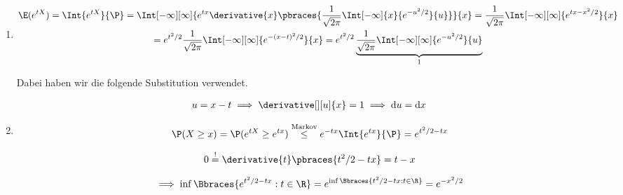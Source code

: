 \begin{solution}

\begin{enumerate}[label = (\alph*)]

    \item

    \begin{multline*}
        \E(e^{t X})
        =
        \Int{e^{t X}}{\P}
        =
        \Int[-\infty][\infty]
        {
            e^{t x}
            \derivative{x}
            \pbraces
            {
                \frac{1}{\sqrt{2 \pi}}
                \Int[-\infty]{x}
                {
                    e^{-u^2 / 2}
                }{u}
            }
        }{x}
        =
        \frac{1}{\sqrt{2 \pi}}
        \Int[-\infty][\infty]
        {
            e^{t x - x^2 / 2}
        }{x} \\
        =
        e^{t^2 / 2}
        \frac{1}{\sqrt{2 \pi}}
        \Int[-\infty][\infty]
        {
            e^{-(x - t)^2 / 2}
        }{x}
        =
        e^{t^2 / 2}
        \underbrace
        {
            \frac{1}{\sqrt{2 \pi}}
            \Int[-\infty][\infty]
            {
                e^{-u^2 / 2}
            }{u}
        }_1
    \end{multline*}

    Dabei haben wir die folgende Substitution verwendet.

    \begin{align*}
        u = x - t
        \implies
        \derivative[][u]{x} = 1
        \implies
        \mathrm d u = \mathrm d x
    \end{align*}

    \item \phantom{}


    \begin{align*}
        \P(X \geq x)
        =
        \P(e^{t X} \geq e^{t x})
        \stackrel
        {
            \text{Markov}
        }{\leq}
        e^{-t x} \Int{e^{t x}}{\P}
        =
        e^{t^2 / 2 - t x}
    \end{align*}

    \begin{align*}
        0
        \stackrel{!}{=}
        \derivative{t}
        \pbraces
        {
            t^2 / 2 - t x
        }
        =
        t - x
    \end{align*}

    \begin{align*}
        \implies
        \inf \Bbraces{e^{t^2 / 2 - t x}: t \in \R}
        =
        e^{\inf \Bbraces{t^2 / 2 - t x: t \in \R}}
        =
        e^{-x^2 / 2}
    \end{align*}

\end{enumerate}

\end{solution}

